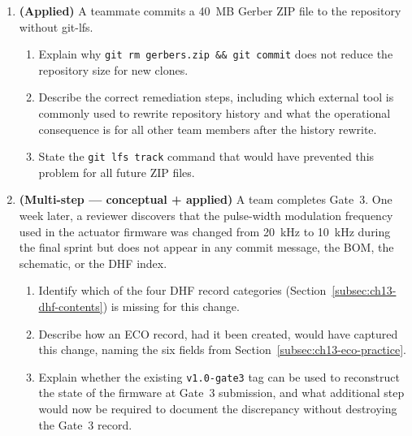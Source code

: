 \begin{enumerate}
  \item \textbf{(Applied)} A teammate commits a 40~MB Gerber ZIP file to the repository
        without git-lfs.
        \begin{enumerate}
          \item[(a)] Explain why \texttt{git rm gerbers.zip \&\& git commit} does not
                     reduce the repository size for new clones.
          \item[(b)] Describe the correct remediation steps, including which external tool
                     is commonly used to rewrite repository history and what the
                     operational consequence is for all other team members after the
                     history rewrite.
          \item[(c)] State the \texttt{git lfs track} command that would have prevented
                     this problem for all future ZIP files.
        \end{enumerate}

  \item \textbf{(Multi-step --- conceptual + applied)} A team completes Gate~3.
        One week later, a reviewer discovers that the pulse-width modulation frequency
        used in the actuator firmware was changed from 20~kHz to 10~kHz during the final
        sprint but does not appear in any commit message, the BOM, the schematic, or the
        DHF index.
        \begin{enumerate}
          \item[(a)] Identify which of the four DHF record categories
                     (Section~\ref{subsec:ch13-dhf-contents}) is missing for this change.
          \item[(b)] Describe how an ECO record, had it been created, would have captured
                     this change, naming the six fields from
                     Section~\ref{subsec:ch13-eco-practice}.
          \item[(c)] Explain whether the existing \texttt{v1.0-gate3} tag can be used to
                     reconstruct the state of the firmware at Gate~3 submission, and what
                     additional step would now be required to document the discrepancy
                     without destroying the Gate~3 record.
        \end{enumerate}

\end{enumerate}

